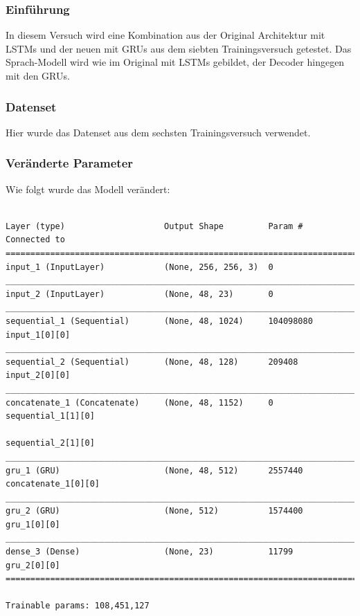 \documentclass[pdftex,a4paper,halfparskip, article]{scrartcl}
\begin{document}


\subsubsection*{Einführung}

In diesem Versuch wird eine Kombination aus der Original Architektur mit LSTMs und der neuen mit GRUs aus dem siebten Trainingsversuch getestet. Das Sprach-Modell wird wie im Original mit LSTMs gebildet, der Decoder hingegen mit den GRUs. 

\subsubsection*{Datenset}

Hier wurde das Datenset aus dem sechsten Trainingsversuch verwendet.

\subsubsection*{Veränderte Parameter}

Wie folgt wurde das Modell verändert:
\begin{verbatim}

Layer (type)                    Output Shape         Param #     Connected to
=============================================================================
input_1 (InputLayer)            (None, 256, 256, 3)  0
_____________________________________________________________________________
input_2 (InputLayer)            (None, 48, 23)       0
_____________________________________________________________________________
sequential_1 (Sequential)       (None, 48, 1024)     104098080   input_1[0][0]
_____________________________________________________________________________
sequential_2 (Sequential)       (None, 48, 128)      209408      input_2[0][0]
_____________________________________________________________________________
concatenate_1 (Concatenate)     (None, 48, 1152)     0           sequential_1[1][0]
                                                                 sequential_2[1][0]
_____________________________________________________________________________
gru_1 (GRU)                     (None, 48, 512)      2557440     concatenate_1[0][0]
_____________________________________________________________________________
gru_2 (GRU)                     (None, 512)          1574400     gru_1[0][0]
_____________________________________________________________________________
dense_3 (Dense)                 (None, 23)           11799       gru_2[0][0]
=============================================================================

Trainable params: 108,451,127

\end{verbatim}
\end{document}

